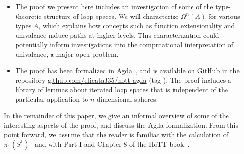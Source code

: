 \begin{itemize}
\item The proof we present here includes an investigation of some of the
  type-theoretic structure of loop spaces.  We will characterize
  $\Omega^n(A)$ for various types $A$, which explains how concepts such
  as function extensionality and univalence induce paths at higher
  levels.  This characterization could potentially inform investigations
  into the computational interpretation of univalence, a major open
  problem.  

\item The proof has been formalized in Agda~\citep{norell07thesis}, and
  is available on GitHub in the repository
  \url{github.com/dlicata335/hott-agda} (tag ).  The proof includes a library
  of lemmas about iterated loop spaces that is independent of the
  particular application to $n$-dimensional spheres.
\end{itemize}

In the remainder of this paper, we give an informal overview of some
of the interesting aspects of the proof, and discuss the Agda
formalization.  From this point forward, we assume that the reader is
familiar with the calculation of $\pi_1(S^1)$~\citep{ls13pi1s1} and with
Part I and Chapter 8 of the HoTT book~\citep{uf13hott-book}.  

